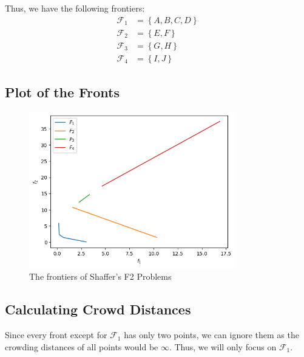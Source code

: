 Thus, we have the following frontiers:
\[
\begin{aligned}
    \mathcal{F}_1 &= \left\{A, B, C, D\right\} \\
    \mathcal{F}_2 &= \left\{E, F\right\} \\
    \mathcal{F}_3 &= \left\{G, H\right\} \\
    \mathcal{F}_4 &= \left\{I, J\right\}
\end{aligned}
\]

\newpage

\subsection{Plot of the Fronts}

\begin{figure}[ht]
    \centering
    \includegraphics[width=0.8\textwidth]{images/p2-pareto_front.png}
    \caption{The frontiers of Shaffer's F2 Problems}
\end{figure}

\subsection{Calculating Crowd Distances}

Since every front except for \(\mathcal{F}_1\) has only two points, we can ignore them as the crowding distances of all points would be \(\infty\). Thus, we will only focus on \(\mathcal{F}_1\).

